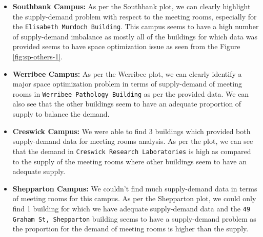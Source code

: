 \begin{itemize}
    
    \item \textbf{Southbank Campus:} As per the Southbank plot, we can clearly highlight the supply-demand problem with respect to the meeting rooms, especially for the \texttt{Elisabeth Murdoch Building}. This campus seems to have a high number of supply-demand imbalance as mostly all of the buildings for which data was provided seems to have space optimization issue as seen from the Figure \ref{fig:sp-others-1}.
    
    \item \textbf{Werribee Campus:} As per the Werribee plot, we can clearly identify a major space optimization problem in terms of supply-demand of meeting rooms in \texttt{Werribee Pathology Building} as per the provided data. We can also see that the other buildings seem to have an adequate proportion of supply to balance the demand.
    
    \item \textbf{Creswick Campus:} We were able to find 3 buildings which provided both supply-demand data for meeting rooms analysis. As per the plot, we can see that the demand in \texttt{Creswick Research Laboratories} is high as compared to the supply of the meeting rooms where other buildings seem to have an adequate supply.
    
    \item \textbf{Shepparton Campus:} We couldn't find much supply-demand data in terms of meeting rooms for this campus. As per the Shepparton plot, we could only find 1 building for which we have adequate supply-demand data and the \texttt{49 Graham St, Shepparton} building seems to have a supply-demand problem as the proportion for the demand of meeting rooms is higher than the supply.
    
    
\end{itemize}

